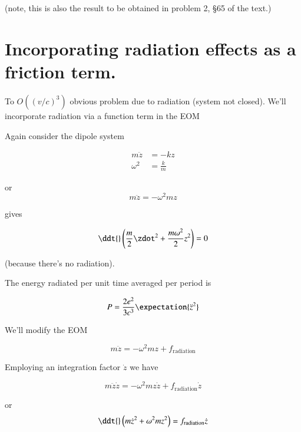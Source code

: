 (note, this is also the result to be obtained in problem 2, \S 65 of the text.)

\section{Incorporating radiation effects as a friction term.}

To $O((v/c)^3)$ obvious problem due to radiation (system not closed).  We'll incorporate radiation via a function term in the EOM

Again consider the dipole system

\begin{align}\label{eqn:relativisticElectrodynamicsL26:110}
m \ddot{z} &= -k z \\
\omega^2 &= \frac{k}{m}
\end{align}

or
\begin{equation}\label{eqn:relativisticElectrodynamicsL26:130}
m \ddot{z} = -\omega^2 m z
\end{equation}

gives

\begin{equation}\label{eqn:relativisticElectrodynamicsL26:150}
\ddt{}\left( \frac{m}{2} \zdot^2 + \frac{ m \omega^2 }{2} z^2 \right) = 0 
\end{equation}

(because there's no radiation).

The energy radiated per unit time averaged per period is

\begin{equation}\label{eqn:relativisticElectrodynamicsL26:170}
P = \frac{ 2 e^2 }{ 3 c^3} \expectation{ \ddot{z}^2 }
\end{equation}

We'll modify the EOM

\begin{equation}\label{eqn:relativisticElectrodynamicsL26:190}
m \ddot{z} = -\omega^2 m z + f_{\text{radiation}}
\end{equation}

Employing an integration factor $\dot{z}$ we have

\begin{equation}\label{eqn:relativisticElectrodynamicsL26:210}
m \ddot{z} \dot{z} = -\omega^2 m z \dot{z} + f_{\text{radiation}} \dot{z}
\end{equation}

or
\begin{equation}\label{eqn:relativisticElectrodynamicsL26:230}
\ddt{} 
\left( m \dot{z}^2 + \omega^2 m z^2 \right) 
= 
f_{\text{radiation}} \dot{z}
\end{equation}

